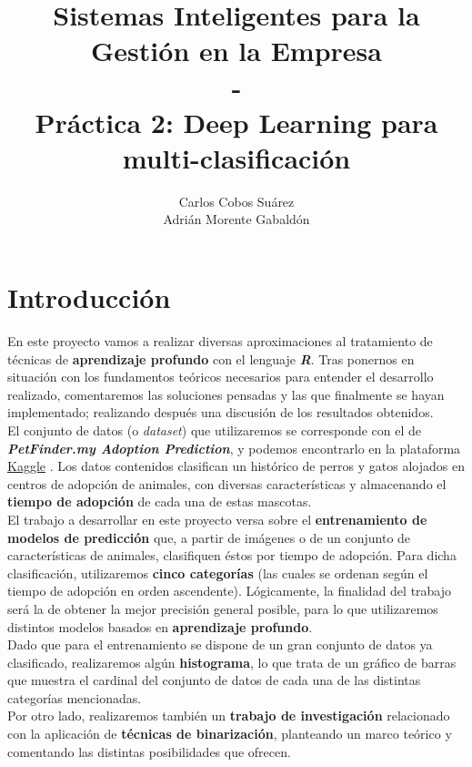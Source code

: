 \documentclass[]{scrartcl}
\title{Sistemas Inteligentes para la Gestión en la Empresa\\-\\Práctica 2: Deep Learning para multi-clasificación}
\author{Carlos Cobos Suárez\\Adrián Morente Gabaldón}
\begin{document}
\maketitle
\newpage
\tableofcontents
\newpage

\section{Introducción}

En este proyecto vamos a realizar diversas aproximaciones al tratamiento de técnicas de \textbf{aprendizaje profundo} con el lenguaje \textbf{\textit{R}}. Tras ponernos en situación con los fundamentos teóricos necesarios para entender el desarrollo realizado, comentaremos las soluciones pensadas y las que finalmente se hayan implementado; realizando después una discusión de los resultados obtenidos.\\

El conjunto de datos (o \textit{dataset}) que utilizaremos se corresponde con el de \textbf{\textit{PetFinder.my Adoption Prediction}}, y podemos encontrarlo en la plataforma \href{https://kaggle.com}{Kaggle} \cite{petfinder-dataset}. Los datos contenidos clasifican un histórico de perros y gatos alojados en centros de adopción de animales, con diversas características y almacenando el \textbf{tiempo de adopción} de cada una de estas mascotas.\\

El trabajo a desarrollar en este proyecto versa sobre el \textbf{entrenamiento de modelos de predicción} que, a partir de imágenes o de un conjunto de características de animales, clasifiquen éstos por tiempo de adopción. Para dicha clasificación, utilizaremos \textbf{cinco categorías} (las cuales se ordenan según el tiempo de adopción en orden ascendente). Lógicamente, la finalidad del trabajo será la de obtener la mejor precisión general posible, para lo que utilizaremos distintos modelos basados en \textbf{aprendizaje profundo}.\\

Dado que para el entrenamiento se dispone de un gran conjunto de datos ya clasificado, realizaremos algún \textbf{histograma}, lo que trata de un gráfico de barras que muestra el cardinal del conjunto de datos de cada una de las distintas categorías mencionadas.\\

Por otro lado, realizaremos también un \textbf{trabajo de investigación} relacionado con la aplicación de \textbf{técnicas de binarización}, planteando un marco teórico y comentando las distintas posibilidades que ofrecen.
\end{document}
